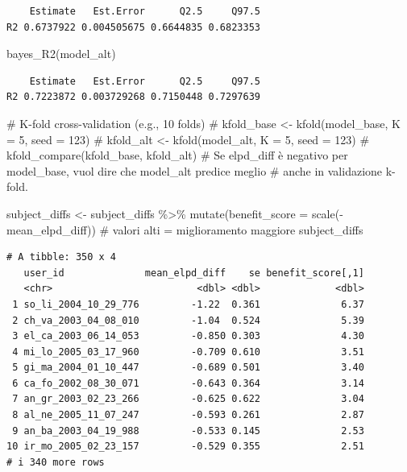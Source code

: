 \documentclass[
  11pt,
  a4paper,
  onecolumn]{article}
\newenvironment{Shaded}{}{}
\newcommand{\AttributeTok}[1]{\textcolor[rgb]{0.84,0.23,0.29}{#1}}
\newcommand{\CommentTok}[1]{\textcolor[rgb]{0.42,0.45,0.49}{#1}}
\newcommand{\FunctionTok}[1]{\textcolor[rgb]{0.44,0.26,0.76}{#1}}
\newcommand{\NormalTok}[1]{\textcolor[rgb]{0.14,0.16,0.18}{#1}}
\newcommand{\OtherTok}[1]{\textcolor[rgb]{0.44,0.26,0.76}{#1}}
\newcommand{\SpecialCharTok}[1]{\textcolor[rgb]{0.00,0.36,0.77}{#1}}
\begin{document}
\begin{verbatim}
    Estimate   Est.Error      Q2.5     Q97.5
R2 0.6737922 0.004505675 0.6644835 0.6823353
\end{verbatim}

\begin{Shaded}
\begin{Highlighting}[]
\FunctionTok{bayes\_R2}\NormalTok{(model\_alt)}
\end{Highlighting}
\end{Shaded}

\begin{verbatim}
    Estimate   Est.Error      Q2.5     Q97.5
R2 0.7223872 0.003729268 0.7150448 0.7297639
\end{verbatim}

\begin{Shaded}
\begin{Highlighting}[]
\CommentTok{\# K{-}fold cross{-}validation (e.g., 10 folds)}
\CommentTok{\# kfold\_base \textless{}{-} kfold(model\_base, K = 5, seed = 123)}
\CommentTok{\# kfold\_alt  \textless{}{-} kfold(model\_alt,  K = 5, seed = 123)}
\CommentTok{\# kfold\_compare(kfold\_base, kfold\_alt)}
\CommentTok{\# Se elpd\_diff è negativo per model\_base, vuol dire che model\_alt predice meglio }
\CommentTok{\# anche in validazione k{-}fold.}
\end{Highlighting}
\end{Shaded}

\begin{Shaded}
\begin{Highlighting}[]
\NormalTok{subject\_diffs }\OtherTok{\textless{}{-}}\NormalTok{ subject\_diffs }\SpecialCharTok{\%\textgreater{}\%}
  \FunctionTok{mutate}\NormalTok{(}\AttributeTok{benefit\_score =} \FunctionTok{scale}\NormalTok{(}\SpecialCharTok{{-}}\NormalTok{mean\_elpd\_diff)) }
\CommentTok{\# valori alti = miglioramento maggiore}
\NormalTok{subject\_diffs}
\end{Highlighting}
\end{Shaded}

\begin{verbatim}
# A tibble: 350 x 4
   user_id              mean_elpd_diff    se benefit_score[,1]
   <chr>                         <dbl> <dbl>             <dbl>
 1 so_li_2004_10_29_776         -1.22  0.361              6.37
 2 ch_va_2003_04_08_010         -1.04  0.524              5.39
 3 el_ca_2003_06_14_053         -0.850 0.303              4.30
 4 mi_lo_2005_03_17_960         -0.709 0.610              3.51
 5 gi_ma_2004_01_10_447         -0.689 0.501              3.40
 6 ca_fo_2002_08_30_071         -0.643 0.364              3.14
 7 an_gr_2003_02_23_266         -0.625 0.622              3.04
 8 al_ne_2005_11_07_247         -0.593 0.261              2.87
 9 an_ba_2003_04_19_988         -0.533 0.145              2.53
10 ir_mo_2005_02_23_157         -0.529 0.355              2.51
# i 340 more rows
\end{verbatim}
\end{document}
